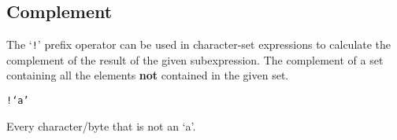 
\subsection{Complement}
{
	The `\texttt{!}' prefix operator can be used in character-set expressions
	to calculate the complement of the result of the given subexpression. The
	complement of a set containing all the elements \textbf{not} contained in
	the given set.
	
	\begin{itemize}
	{
		\item \texttt{!{}`a'}
		
			Every character/byte that is not an `a'.
	}
	\end{itemize}
}
